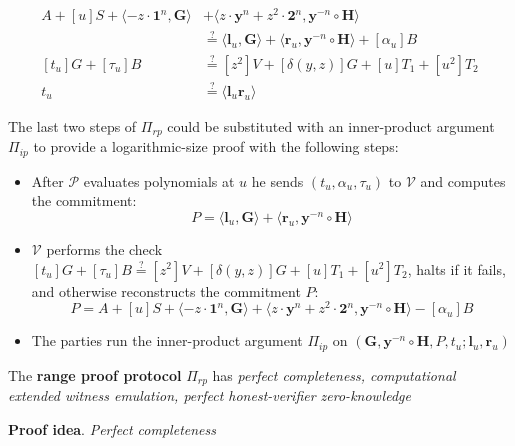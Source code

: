 \documentclass[../../book.tex]{subfiles}
\begin{document}
\begin{definition}
\begin{itemize}
            \begin{equation}
                \begin{aligned}
                    A + [u]S + \langle -z \cdot \mathbf{1}^n, \mathbf{G} \rangle &+ \langle z \cdot \mathbf{y}^n + z^2 \cdot \mathbf{2}^n, \mathbf{y}^{-n} \circ \mathbf{H} \rangle \\
                    &\stackrel{\text{?}}{=} \langle \mathbf{l}_u, \mathbf{G} \rangle + \langle \mathbf{r}_u, \mathbf{y}^{-n} \circ \mathbf{H} \rangle + [\alpha_u]B \\
                    [t_u]G + [\tau_u]B &\stackrel{\text{?}}{=} [z^2]V + [\delta(y,z)]G + [u]T_1 + [u^2]T_2 \\
                    t_u &\stackrel{\text{?}}{=} \langle \mathbf{l}_u \mathbf{r}_u \rangle
                \end{aligned}
            \end{equation}
    \end{itemize}
\end{definition}

\begin{remark}
    The last two steps of $\Pi_{rp}$ could be substituted with an inner-product argument $\Pi_{ip}$ to provide a logarithmic-size proof with the following steps:
    \begin{itemize}
        \item After $\mathcal{P}$ evaluates polynomials at $u$ he sends $(t_u, \alpha_u, \tau_u)$ to $\mathcal{V}$ and computes the commitment:
        $$P = \langle \mathbf{l}_u, \mathbf{G} \rangle + \langle \mathbf{r}_u, \mathbf{y}^{-n} \circ \mathbf{H} \rangle$$
        \item $\mathcal{V}$ performs the check $[t_u]G + [\tau_u]B \stackrel{\text{?}}{=} [z^2]V + [\delta(y,z)]G + [u]T_1 + [u^2]T_2$, halts if it fails, and otherwise reconstructs the commitment $P$:
        $$P = A + [u]S + \langle -z \cdot \mathbf{1}^n, \mathbf{G} \rangle + \langle z \cdot \mathbf{y}^n + z^2 \cdot \mathbf{2}^n, \mathbf{y}^{-n} \circ \mathbf{H} \rangle - [\alpha_u]B$$
        \item The parties run the inner-product argument $\Pi_{ip}$ on $(\mathbf{G},\mathbf{y}^{-n} \circ \mathbf{H}, P, t_u; \mathbf{l}_u, \mathbf{r}_u)$
    \end{itemize}
\end{remark}

\begin{theorem}
    The \textbf{range proof protocol} $\Pi_{rp}$ has \textit{perfect completeness, computational extended witness emulation, perfect honest-verifier zero-knowledge}
    \label{th:range_proof}
\end{theorem}
\textbf{Proof idea}. \textit{Perfect completeness} 
\end{document}

